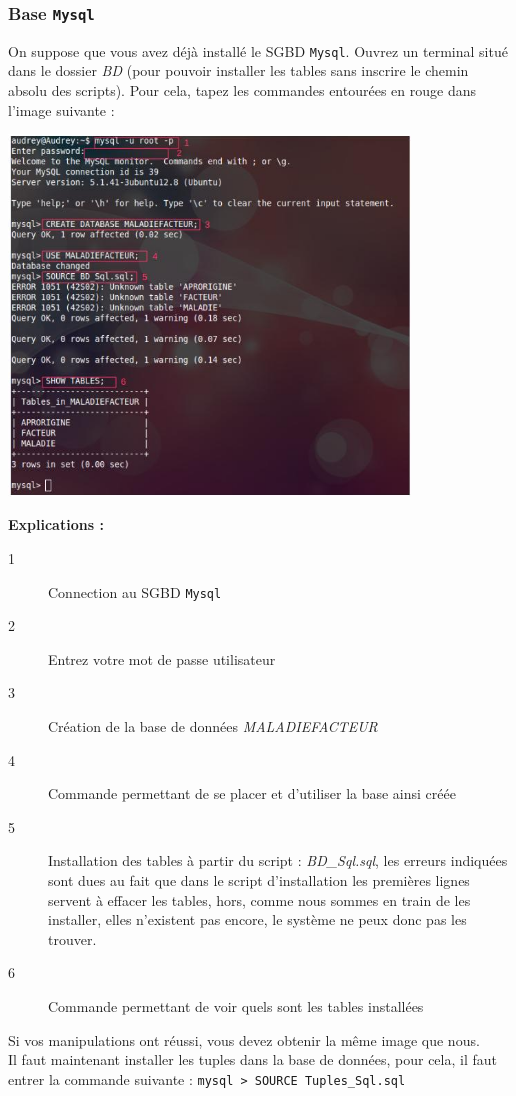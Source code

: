 \documentclass[12pt]{article}
\begin{document}
	\subsubsection{Base \texttt{Mysql}}
	On suppose que vous avez déjà installé le SGBD \texttt{Mysql}. Ouvrez un terminal situé dans le dossier \textit{BD} (pour pouvoir installer les tables sans inscrire le chemin absolu des scripts). Pour cela, tapez les commandes entourées en rouge dans l'image suivante : 
	\begin{center}
	\includegraphics[width=0.8\textwidth]{Image/TerminalMysql.png}
\end{center}
	\textbf{Explications : }
	\begin{description}
		\item [1] Connection au SGBD \texttt{Mysql}
		\item [2] Entrez votre mot de passe utilisateur
		\item [3] Création de la base de données \textit{MALADIEFACTEUR}
		\item [4] Commande permettant de se placer et d'utiliser la base ainsi créée
		\item [5] Installation des tables à partir du script : \textit{BD\_Sql.sql}, les erreurs indiquées sont dues au fait que dans le script d'installation les premières lignes servent à effacer les tables, hors, comme nous sommes en train de les installer, elles n'existent pas encore, le système ne peux donc pas les trouver.
		\item [6] Commande permettant de voir quels sont les tables installées
	\end{description}
  	\indent Si vos manipulations ont réussi, vous devez obtenir la même image que nous. \\
  	\indent Il faut maintenant installer les tuples dans la base de données, pour cela, il faut entrer la commande suivante : \texttt{mysql > SOURCE Tuples\_Sql.sql}
	
\end{document}
